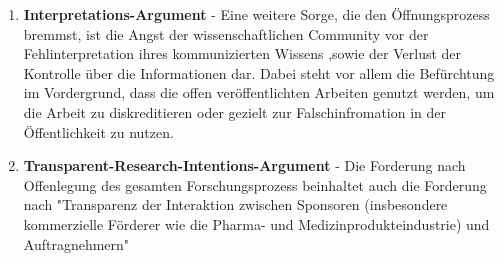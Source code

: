 \begin{enumerate}
\item \textbf{Interpretations-Argument} - Eine weitere Sorge, die den Öffnungsprozess bremmst, ist die Angst der wissenschaftlichen Community vor der Fehlinterpretation ihres kommunizierten Wissens ,sowie der Verlust der Kontrolle über die Informationen\cite{gibbons_1994} dar. Dabei steht vor allem die Befürchtung im Vordergrund, dass die offen veröffentlichten Arbeiten genutzt werden, um die Arbeit zu diskreditieren oder gezielt zur Falschinfromation in der Öffentlichkeit zu nutzen.
\item \textbf{Transparent-Research-Intentions-Argument} - Die Forderung nach Offenlegung des gesamten Forschungsprozess beinhaltet auch die Forderung nach "Transparenz der Interaktion zwischen Sponsoren (insbesondere kommerzielle Förderer wie die Pharma- und Medizinprodukteindustrie) und Auftragnehmern" \cite{Stengel_2013} 
\end{enumerate}
